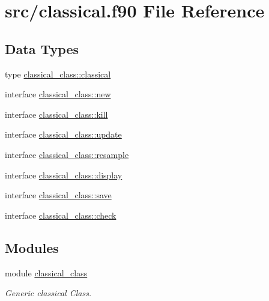 \hypertarget{classical_8f90}{}\section{src/classical.f90 File Reference}
\label{classical_8f90}
\subsection*{Data Types}
\begin{DoxyCompactItemize}
\item 
type \hyperlink{structclassical__class_1_1classical}{classical\+\_\+class\+::classical}
\item 
interface \hyperlink{interfaceclassical__class_1_1new}{classical\+\_\+class\+::new}
\item 
interface \hyperlink{interfaceclassical__class_1_1kill}{classical\+\_\+class\+::kill}
\item 
interface \hyperlink{interfaceclassical__class_1_1update}{classical\+\_\+class\+::update}
\item 
interface \hyperlink{interfaceclassical__class_1_1resample}{classical\+\_\+class\+::resample}
\item 
interface \hyperlink{interfaceclassical__class_1_1display}{classical\+\_\+class\+::display}
\item 
interface \hyperlink{interfaceclassical__class_1_1save}{classical\+\_\+class\+::save}
\item 
interface \hyperlink{interfaceclassical__class_1_1check}{classical\+\_\+class\+::check}
\end{DoxyCompactItemize}
\subsection*{Modules}
\begin{DoxyCompactItemize}
\item 
module \hyperlink{namespaceclassical__class}{classical\+\_\+class}
\begin{DoxyCompactList}\small\item\em Generic classical Class. \end{DoxyCompactList}\end{DoxyCompactItemize}
